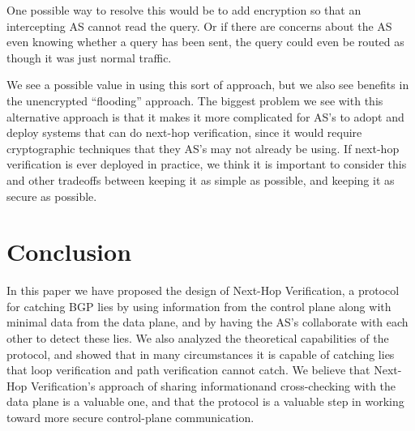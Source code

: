 \documentclass[10pt]{article}
\begin{document}
One possible way to resolve this would be to add encryption so that an intercepting AS cannot read the query. Or if there are concerns about the AS even knowing whether a query has been sent, the query could even be routed as though it was just normal traffic.

We see a possible value in using this sort of approach, but we also see benefits in the unencrypted ``flooding'' approach. The biggest problem we see with this alternative approach is that it makes it more complicated for AS's to adopt and deploy systems that can do next-hop verification, since it would require cryptographic techniques that they AS's may not already be using. If next-hop verification is ever deployed in practice, we think it is important to consider this and other tradeoffs between keeping it as simple as possible, and keeping it as secure as possible.


\section{Conclusion}
In this paper we have proposed the design of Next-Hop Verification, a protocol for catching BGP lies by using information from the control plane along with minimal data from the data plane, and by having the AS's collaborate with each other to detect these lies. We also analyzed the theoretical capabilities of the protocol, and showed that in many circumstances it is capable of catching lies that loop verification and path verification cannot catch. We believe that Next-Hop Verification's approach of sharing informationand cross-checking with the data plane is a valuable one, and that the protocol is a valuable step in working toward more secure control-plane communication.

{}


\clearpage
\end{document}

